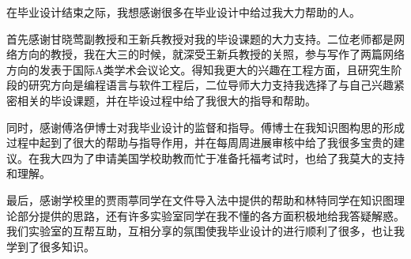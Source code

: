 \begin{thanks}

  在毕业设计结束之际，我想感谢很多在毕业设计中给过我大力帮助的人。

  首先感谢甘晓莺副教授和王新兵教授对我的毕设课题的大力支持。二位老师都是网络方向的教授，我在大三的时候，就深受王新兵教授的关照，参与写作了两篇网络方向的发表于国际A类学术会议论文。得知我更大的兴趣在工程方面，且研究生阶段的研究方向是编程语言与软件工程后，二位导师大力支持我选择了与自己兴趣紧密相关的毕设课题，并在毕设过程中给了我很大的指导和帮助。

  同时，感谢傅洛伊博士对我毕业设计的监督和指导。傅博士在我知识图构思的形成过程中起到了很大的帮助与指导作用，并在每周周进展审核中给了我很多宝贵的建议。在我大四为了申请美国学校助教而忙于准备托福考试时，也给了我莫大的支持和理解。

  最后，感谢学校里的贾雨葶同学在文件导入法中提供的帮助和林特同学在知识图理论部分提供的思路，还有许多实验室同学在我不懂的各方面积极地给我答疑解惑。我们实验室的互帮互助，互相分享的氛围使我毕业设计的进行顺利了很多，也让我学到了很多知识。

\end{thanks}

